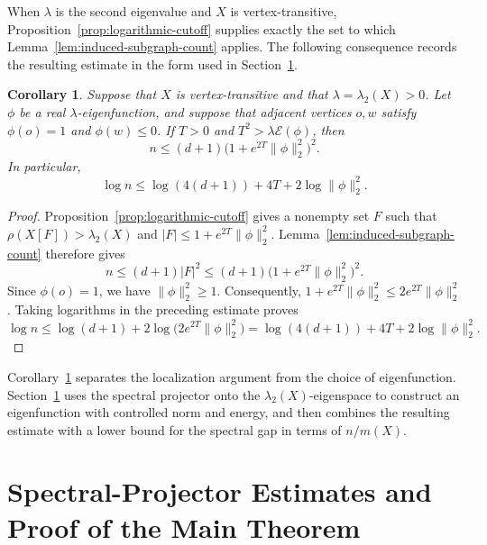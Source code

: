 \documentclass[11pt]{article}
\newtheorem{corollary}[theorem]{Corollary}
\theoremstyle{definition}
\theoremstyle{remark}
\begin{document}
When $\lambda$ is the second eigenvalue and $X$ is vertex-transitive, Proposition~\ref{prop:logarithmic-cutoff} supplies exactly the set to which Lemma~\ref{lem:induced-subgraph-count} applies. The following consequence records the resulting estimate in the form used in Section~\ref{sec:projector-main-proof}.

\begin{corollary}\label{cor:logarithmic-localization}
Suppose that $X$ is vertex-transitive and that $\lambda=\lambda_2(X)>0$. Let $\phi$ be a real $\lambda$-eigenfunction, and suppose that adjacent vertices $o,w$ satisfy $\phi(o)=1$ and $\phi(w)\leq0$. If $T>0$ and $T^2>\lambda\mathcal E(\phi)$, then
\[
n\leq(d+1)\bigl(1+e^{2T}\|\phi\|_2^2\bigr)^2.
\]
In particular,
\[
\log n\leq\log(4(d+1))+4T+2\log\|\phi\|_2^2.
\]
\end{corollary}

\begin{proof}
Proposition~\ref{prop:logarithmic-cutoff} gives a nonempty set $F$ such that $\rho(X[F])>\lambda_2(X)$ and $|F|\leq1+e^{2T}\|\phi\|_2^2$. Lemma~\ref{lem:induced-subgraph-count} therefore gives
\[
n\leq(d+1)|F|^2\leq(d+1)\bigl(1+e^{2T}\|\phi\|_2^2\bigr)^2.
\]
Since $\phi(o)=1$, we have $\|\phi\|_2^2\geq1$. Consequently, $1+e^{2T}\|\phi\|_2^2\leq2e^{2T}\|\phi\|_2^2$. Taking logarithms in the preceding estimate proves
\[
\log n\leq\log(d+1)+2\log\bigl(2e^{2T}\|\phi\|_2^2\bigr)=\log(4(d+1))+4T+2\log\|\phi\|_2^2.
\]
\end{proof}

Corollary~\ref{cor:logarithmic-localization} separates the localization argument from the choice of eigenfunction. Section~\ref{sec:projector-main-proof} uses the spectral projector onto the $\lambda_2(X)$-eigenspace to construct an eigenfunction with controlled norm and energy, and then combines the resulting estimate with a lower bound for the spectral gap in terms of $n/m(X)$.

\section{Spectral-Projector Estimates and Proof of the Main Theorem}\label{sec:projector-main-proof}
\end{document}
